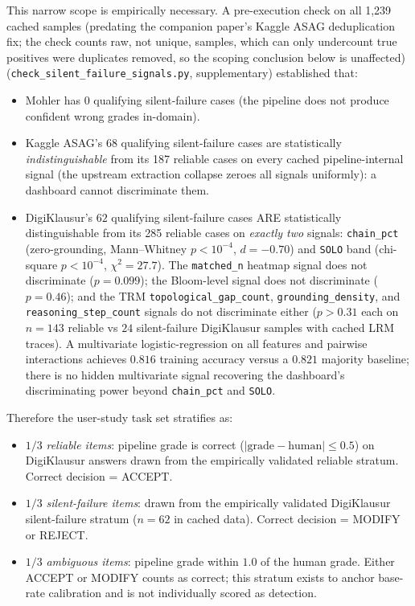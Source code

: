 \documentclass[journal,review]{vgtc}
\begin{document}
This narrow scope is empirically necessary. A pre-execution check on
all 1,239 cached samples (predating the companion paper's Kaggle ASAG
deduplication fix; the check counts raw, not unique, samples, which
can only undercount true positives were duplicates removed, so the
scoping conclusion below is unaffected) (\texttt{check\_silent\_failure\_signals.py},
supplementary) established that:
\begin{itemize}
  \item Mohler has $0$ qualifying silent-failure cases (the pipeline
  does not produce confident wrong grades in-domain).
  \item Kaggle ASAG's $68$ qualifying silent-failure cases are
  statistically \emph{indistinguishable} from its 187 reliable cases on
  every cached pipeline-internal signal (the upstream extraction
  collapse zeroes all signals uniformly): a dashboard cannot
  discriminate them.
  \item DigiKlausur's $62$ qualifying silent-failure cases ARE
  statistically distinguishable from its 285 reliable cases on
  \emph{exactly two} signals: \texttt{chain\_pct} (zero-grounding,
  Mann--Whitney $p < 10^{-4}$, $d = -0.70$) and \texttt{SOLO} band
  (chi-square $p < 10^{-4}$, $\chi^2 = 27.7$). The \texttt{matched\_n}
  heatmap signal does not discriminate ($p = 0.099$); the Bloom-level
  signal does not discriminate ($p = 0.46$); and the TRM
  \texttt{topological\_gap\_count}, \texttt{grounding\_density}, and
  \texttt{reasoning\_step\_count} signals do not discriminate either
  ($p > 0.31$ each on $n = 143$ reliable vs $24$ silent-failure
  DigiKlausur samples with cached LRM traces). A multivariate
  logistic-regression on all features and pairwise interactions
  achieves $0.816$ training accuracy versus a $0.821$ majority
  baseline; there is no hidden multivariate signal recovering the
  dashboard's discriminating power beyond \texttt{chain\_pct} and
  \texttt{SOLO}.
\end{itemize}

Therefore the user-study task set stratifies as:
\begin{itemize}
  \item $1/3$ \emph{reliable items}: pipeline grade is correct
  ($|\text{grade} - \text{human}| \leq 0.5$) on DigiKlausur answers
  drawn from the empirically validated reliable stratum. Correct
  decision = ACCEPT.
  \item $1/3$ \emph{silent-failure items}: drawn from the empirically
  validated DigiKlausur silent-failure stratum ($n = 62$ in cached
  data). Correct decision = MODIFY or REJECT.
  \item $1/3$ \emph{ambiguous items}: pipeline grade within $1.0$ of
  the human grade. Either ACCEPT or MODIFY counts as correct; this
  stratum exists to anchor base-rate calibration and is not
  individually scored as detection.
\end{itemize}
\end{document}
